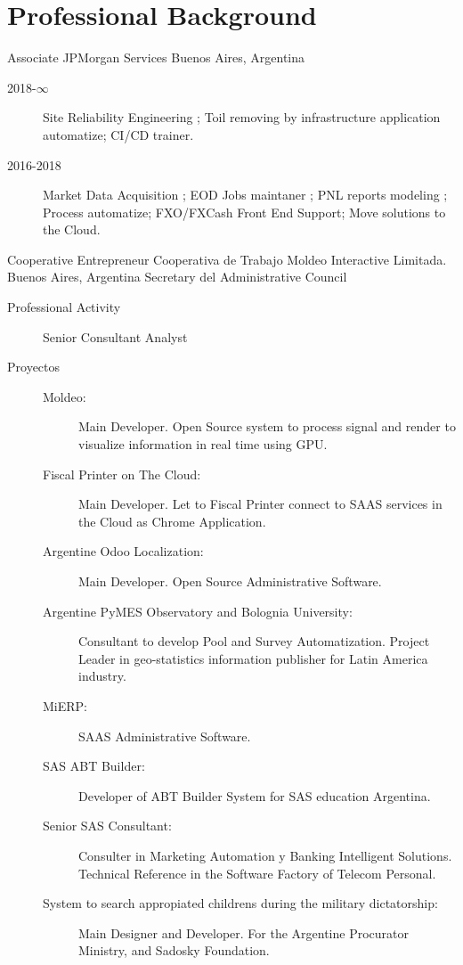 \documentclass[9pt,a4paper,sans]{moderncv}
\newcommand{\actual}{$\infty$}
\begin{document}
\section{Professional Background}\label{profesional:desde}

\cventry{2016-\actual}
	{Associate}
	{JPMorgan Services}
	{Buenos Aires, Argentina}
	{}
	{\begin{description}
	 \item [2018-\actual] Site Reliability Engineering ; Toil removing by infrastructure application automatize; CI/CD trainer.
	 \item [2016-2018] Market Data Acquisition ; EOD Jobs maintaner ; PNL reports modeling ; Process automatize; FXO/FXCash Front End Support; Move solutions to the Cloud.
         \end{description}}
	{Cooperative Entrepreneur}
	{Cooperativa de Trabajo Moldeo Interactive Limitada.}
	{Buenos Aires, Argentina}
	{Secretary del Administrative Council}
	{\begin{description}
	\item [Professional Activity] Senior Consultant Analyst
	\item [Proyectos]
	\begin{description}
		\item [Moldeo:] Main Developer. Open Source system to process signal and render to visualize information in real time using GPU.
		\item [Fiscal Printer on The Cloud:] Main Developer. Let to Fiscal Printer connect to SAAS services in the Cloud as Chrome Application.
		\item [Argentine Odoo Localization:] Main Developer. Open Source Administrative Software.
		\item [Argentine PyMES Observatory and Bolognia University:] Consultant to develop Pool and Survey Automatization. Project Leader in geo-statistics information publisher for Latin America industry.
		\item [MiERP:] SAAS Administrative Software.
		\item [SAS ABT Builder:] Developer of ABT Builder System for SAS education Argentina.
		\item [Senior SAS Consultant:] Consulter in Marketing Automation y Banking Intelligent Solutions. Technical Reference in the Software Factory of Telecom Personal.
		\item [System to search appropiated childrens during the military dictatorship:] Main Designer and Developer. For the Argentine Procurator Ministry, and Sadosky Foundation.
	\end{description}
	\end{description}}
\end{document}

